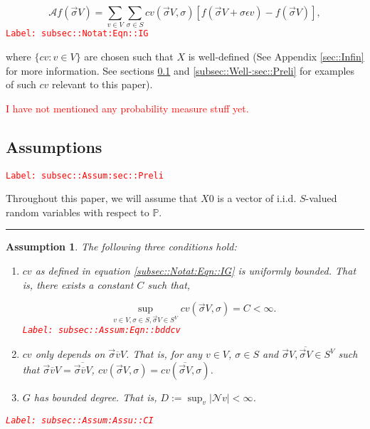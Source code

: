 \documentclass[12pt]{article}
\newcommand{\mb}{\mathbb}
\newcommand{\mc}{\mathcal}
\newcommand{\ov}{\overline}
\newcommand{\ep}{\epsilon}
\newcommand{\tr}{\textcolor{red}}
\newcommand{\labe}[1]{\tr{\texttt{Label: #1}}}
\newcommand{\lin}{\rule{\linewidth}{0.4 pt}}
\newcommand{\pr}{\mb{P}}							%
\newcommand{\defeq}{:=}								%
\renewcommand{\v}{v}							%
\renewcommand{\S}{S}							%
\newcommand{\s}{\sigma}							%
\newcommand{\sv}{\vec{\s}}						%
\newcommand{\ev}{\ep}							%
\newcommand{\X}{X}								%
\newcommand{\IG}{\mc{A}}						%
\newcommand{\IGr}{c}							%
\newcommand{\neigh}{\mc{N}}						%
\newcommand{\cl}{\ov}							%
\newcommand{\const}{C}							%
\newcommand{\degr}{D}							%
\newtheorem{assu}[thms]{Assumption}
\begin{document}
\begin{equation}
\IG f(\sv{}{ V}) = \sum_{\v \in  V}\sum_{\s \in \S} \IGr{\v}(\sv{}{ V},\s)[f(\sv{}{ V} + \s \ev{\v}) - f(\sv{}{ V})],
\label{subsec::Notat:Eqn::IG}
\end{equation}
\labe{subsec::Notat:Eqn::IG}

where \(\{\IGr{\v}:\v\in  V\}\) are chosen such that \(\X{}{}\) is well-defined (See Appendix \ref{sec::Infin} for more information. See sections \ref{subsec::Assum:sec::Preli} and \ref{subsec::Well-:sec::Preli} for examples of such \(\IGr{\v}\) relevant to this paper). 

\tr{I have not mentioned any probability measure stuff yet.}

\subsection{Assumptions}
\label{subsec::Assum:sec::Preli}\labe{subsec::Assum:sec::Preli}

Throughout this paper, we will assume that \(\X{}{0}\) is a vector of i.i.d. \(\S\)-valued random variables with respect to \(\pr\).

\lin

\begin{assu}
The following three conditions hold:
\begin{enumerate}
\item \(\IGr{\v}\) as defined in equation \eqref{subsec::Notat:Eqn::IG} is uniformly bounded. That is, there exists a constant \(\const{}\) such that,

\begin{equation}
\sup_{\v\in  V,\s \in \S,\sv{}{ V}\in \S^ V} \IGr{\v}(\sv{}{ V},\s) = \const{} < \infty.
\label{subsec::Assum:Eqn::bddcv}
\end{equation}
\labe{subsec::Assum:Eqn::bddcv}

\item \(\IGr{\v}\) only depends on \(\sv{\cl{\v}}{ V}\). That is, for any \(\v\in  V\), \(\s\in \S\) and \(\sv{}{ V},\ov{\sv{}{ V}} \in \S^ V\) such that \(\sv{\cl{\v}}{ V} = \ov{\sv{\cl{\v}}{ V}}\), \(\IGr{\v}(\sv{}{ V},\s) = \IGr{\v}(\ov{\sv{}{ V}},\s)\).

\item \(G\) has bounded degree. That is, \(\degr \defeq \sup_\v |\neigh{\v}| < \infty\).
\end{enumerate}
\label{subsec::Assum:Assu::CI}\labe{subsec::Assum:Assu::CI}
\end{assu}
\end{document}
